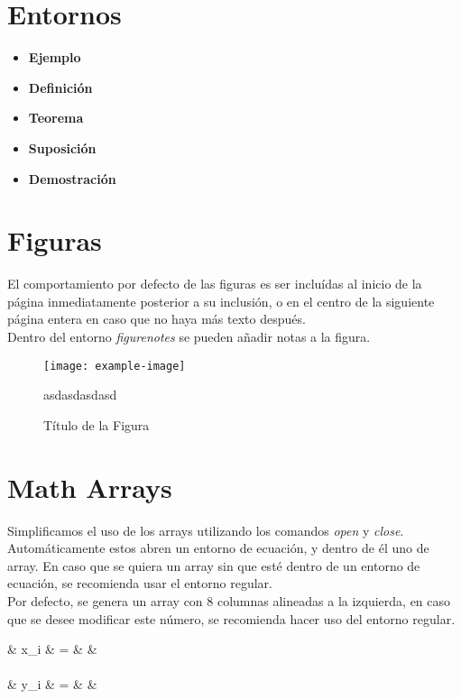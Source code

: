 \documentclass[esp]{colmex}
\begin{document}
\section{Entornos}
\begin{itemize}
    \item \textbf{Ejemplo}


    \item \textbf{Definición}


    \item \textbf{Teorema}


    \item \textbf{Suposición}


    \item \textbf{Demostración}

\end{itemize}

\section{Figuras}

El comportamiento por defecto de las figuras es ser incluídas al inicio de la página inmediatamente posterior a su inclusión, o en el centro de la siguiente página entera en caso que no haya más texto después.\\

Dentro del entorno \textit{figurenotes} se pueden añadir notas a la figura.

\begin{figure}
    \centering
    \texttt{[image: example-image]}
    \caption{Título de la Figura}
    \begin{figurenotes}
        asdasdasdasd
    \end{figurenotes}
\end{figure}


\section{Math Arrays}

Simplificamos el uso de los arrays utilizando los comandos \textit{open} y \textit{close}. Automáticamente estos abren un entorno de ecuación, y dentro de él uno de array. En caso que se quiera un array sin que esté dentro de un entorno de ecuación, se recomienda usar el entorno regular. \\

Por defecto, se genera un array con 8 columnas alineadas a la izquierda, en caso que se desee modificar este número, se recomienda hacer uso del entorno regular.

\open
& x_i & = & \x &  \\
\\
& y_i & = & \y &  \\
\close
\end{document}
